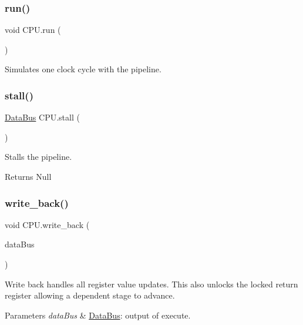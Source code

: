 \subsubsection{\texorpdfstring{run()}{run()}}
{\footnotesize\ttfamily void C\+P\+U.\+run (\begin{DoxyParamCaption}{ }\end{DoxyParamCaption})\hspace{0.3cm}{\ttfamily [package]}}

Simulates one clock cycle with the pipeline. \mbox{\label{class_c_p_u_a16848436db7d768084900aaeaa9c0cce}} 
\subsubsection{\texorpdfstring{stall()}{stall()}}
{\footnotesize\ttfamily \mbox{\hyperlink{class_data_bus}{Data\+Bus}} C\+P\+U.\+stall (\begin{DoxyParamCaption}{ }\end{DoxyParamCaption})\hspace{0.3cm}{\ttfamily [private]}}

Stalls the pipeline.

\begin{DoxyReturn}{Returns}
Null 
\end{DoxyReturn}
\mbox{\label{class_c_p_u_a130b9ffccc2c76d5bcc1b30ef5c4a4db}} 
\subsubsection{\texorpdfstring{write\+\_\+back()}{write\_back()}}
{\footnotesize\ttfamily void C\+P\+U.\+write\+\_\+back (\begin{DoxyParamCaption}\item[{\mbox{\hyperlink{class_data_bus}{Data\+Bus}}}]{data\+Bus }\end{DoxyParamCaption})\hspace{0.3cm}{\ttfamily [private]}}

Write back handles all register value updates. This also unlocks the locked return register allowing a dependent stage to advance.


\begin{DoxyParams}{Parameters}
{\em data\+Bus} & \mbox{\hyperlink{class_data_bus}{Data\+Bus}}\+: output of execute. \\
\hline
\end{DoxyParams}


